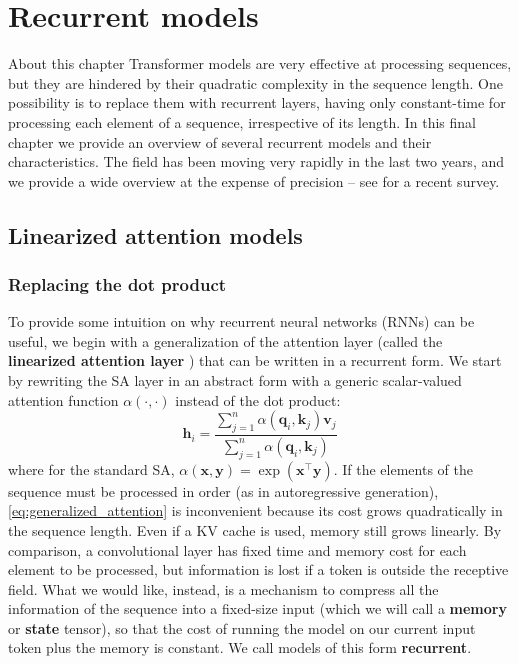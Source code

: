 \chapter{Recurrent models}
\label{chap:rnns}

\begin{supportbox}{About this chapter}
Transformer models are very effective at processing sequences, but they are hindered by their quadratic complexity in the sequence length. One possibility is to replace them with recurrent layers, having only constant-time for processing each element of a sequence, irrespective of its length. In this final chapter we provide an overview of several recurrent models and their characteristics. The field has been moving very rapidly in the last two years, and we provide a wide overview at the expense of precision -- see \cite{tiezzi2024state} for a recent survey.
\end{supportbox}

\section{Linearized attention models}
\subsection{Replacing the dot product}
\label{sec:linearized_transformer_model}

To provide some intuition on why recurrent neural networks (RNNs) can be useful, we begin with a generalization of the attention layer (called the \textbf{linearized attention layer} \cite{katharopoulos2020transformers}) that can be written in a recurrent form. We start by rewriting the SA layer in an abstract form with a generic scalar-valued attention function $\alpha(\cdot, \cdot)$ instead of the dot product:
%
\begin{equation}
\mathbf{h}_i=\frac{\sum_{j=1}^n\alpha\left(\mathbf{q}_i, \mathbf{k}_j\right)\mathbf{v}_j}{\sum_{j=1}^n \alpha\left(\mathbf{q}_i, \mathbf{k}_j\right)}
\label{eq:generalized_attention}
\end{equation}
%
where for the standard SA, $\alpha(\mathbf{x}, \mathbf{y})=\exp(\mathbf{x}^\top\mathbf{y})$. If the elements of the sequence must be processed in order (as in autoregressive generation), \eqref{eq:generalized_attention} is inconvenient because its cost grows quadratically in the sequence length. Even if a KV cache is used, memory still grows linearly. By comparison, a convolutional layer has fixed time and memory cost for each element to be processed, but information is lost if a token is outside the receptive field. What we would like, instead, is a mechanism to compress all the information of the sequence into a fixed-size input (which we will call a \textbf{memory} or \textbf{state} tensor), so that the cost of running the model on our current input token plus the memory is constant. We call models of this form \textbf{recurrent}.

